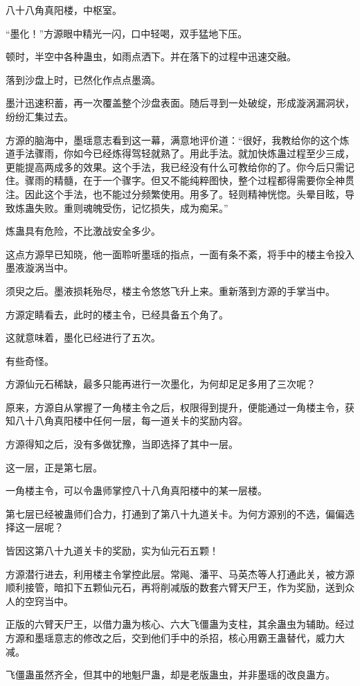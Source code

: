 \begin{this_body}
八十八角真阳楼，中枢室。

“墨化！”方源眼中精光一闪，口中轻喝，双手猛地下压。

顿时，半空中各种蛊虫，如雨点洒下。并在落下的过程中迅速交融。

落到沙盘上时，已然化作点点墨滴。

墨汁迅速积蓄，再一次覆盖整个沙盘表面。随后寻到一处破绽，形成漩涡漏洞状，纷纷汇集过去。

方源的脑海中，墨瑶意志看到这一幕，满意地评价道：“很好，我教给你的这个炼道手法骤雨，你如今已经炼得驾轻就熟了。用此手法。就加快炼蛊过程至少三成，更能提高两成多的效果。这个手法，我已经没有什么可教给你的了。你今后只需记住。骤雨的精髓，在于一个骤字。但又不能纯粹图快，整个过程都得需要你全神贯注。因此这个手法，也不能过分频繁使用。用多了。轻则精神恍惚。头晕目眩，导致炼蛊失败。重则魂魄受伤，记忆损失，成为痴呆。”

炼蛊具有危险，不比激战安全多少。

这点方源早已知晓，他一面聆听墨瑶的指点，一面有条不紊，将手中的楼主令投入墨液漩涡当中。

须臾之后。墨液损耗殆尽，楼主令悠悠飞升上来。重新落到方源的手掌当中。

方源定睛看去，此时的楼主令，已经具备五个角了。

这就意味着，墨化已经进行了五次。

有些奇怪。

方源仙元石稀缺，最多只能再进行一次墨化，为何却足足多用了三次呢？

原来，方源自从掌握了一角楼主令之后，权限得到提升，便能通过一角楼主令，获知八十八角真阳楼中任何一层，每一道关卡的奖励内容。

方源得知之后，没有多做犹豫，当即选择了其中一层。

这一层，正是第七层。

一角楼主令，可以令蛊师掌控八十八角真阳楼中的某一层楼。

第七层已经被蛊师们合力，打通到了第八十九道关卡。为何方源别的不选，偏偏选择这一层呢？

皆因这第八十九道关卡的奖励，实为仙元石五颗！

方源潜行进去，利用楼主令掌控此层。常飚、潘平、马英杰等人打通此关，被方源顺利接管，暗扣下五颗仙元石，再将削减版的数套六臂天尸王，作为奖励，送到众人的空窍当中。

正版的六臂天尸王，以借力蛊为核心、六大飞僵蛊为支柱，其余蛊虫为辅助。经过方源和墨瑶意志的修改之后，交到他们手中的杀招，核心用霸王蛊替代，威力大减。

飞僵蛊虽然齐全，但其中的地魁尸蛊，却是老版蛊虫，并非墨瑶的改良蛊方。


\end{this_body}
